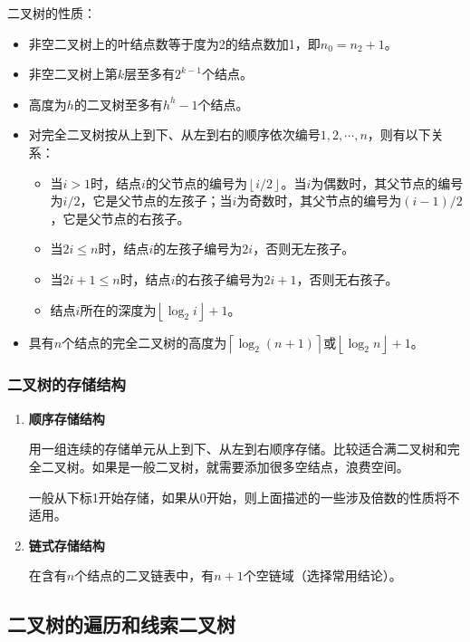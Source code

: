 \documentclass[12pt, a4paper, oneside]{ctexart}
\begin{document}
二叉树的性质：
\begin{itemize}
  \item 非空二叉树上的叶结点数等于度为2的结点数加1，即$n_0=n_2+1$。
  \item 非空二叉树上第$k$层至多有$2^{k-1}$个结点。
  \item 高度为$h$的二叉树至多有$h^h-1$个结点。
  \item 对完全二叉树按从上到下、从左到右的顺序依次编号$1,2,\cdots,n$，则有以下关系：
  \begin{itemize}
    \item 当$i>1$时，结点$i$的父节点的编号为$\left\lfloor i/2 \right\rfloor$。当$i$为偶数时，其父节点的编号为$i/2$，它是父节点的左孩子；当$i$为奇数时，其父节点的编号为$(i-1)/2$，它是父节点的右孩子。
    \item 当$2i\leq n$时，结点$i$的左孩子编号为$2i$，否则无左孩子。
    \item 当$2i+1\leq n$时，结点$i$的右孩子编号为$2i+1$，否则无右孩子。
    \item 结点$i$所在的深度为$\left\lfloor \log_2 i \right\rfloor +1$。
  \end{itemize}
  \item 具有$n$个结点的完全二叉树的高度为$\left\lceil \log_2 (n+1) \right\rceil$或$\left\lfloor \log_2 n \right\rfloor + 1$。
\end{itemize}

\subsubsection{二叉树的存储结构}

\begin{enumerate}
  \item {\bf 顺序存储结构}
  
  用一组连续的存储单元从上到下、从左到右顺序存储。比较适合满二叉树和完全二叉树。如果是一般二叉树，就需要添加很多空结点，浪费空间。

  一般从下标1开始存储，如果从0开始，则上面描述的一些涉及倍数的性质将不适用。

  \item {\bf 链式存储结构}
  
  在含有$n$个结点的二叉链表中，有$n+1$个空链域（选择常用结论）。
\end{enumerate}

\subsection{二叉树的遍历和线索二叉树}
\end{document}
